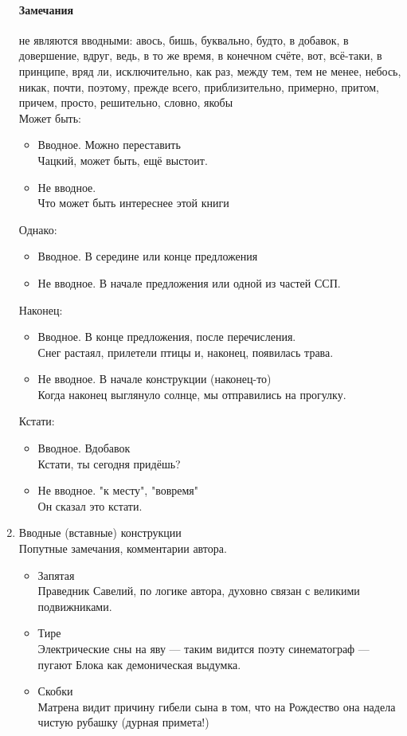 \documentclass{article}
\begin{document}
\begin{enumerate}
  \paragraph{Замечания} не являются вводными:
  авось, бишь, буквально, будто, в добавок, в довершение, вдруг, ведь, в то же время, в конечном счёте, вот, всё-таки,
  в принципе, вряд ли, исключительно, как раз, между тем, тем не менее, небось, никак, почти, поэтому, прежде всего,
  приблизительно, примерно, притом, причем, просто, решительно, словно, якобы\\
  Может быть:
  \begin{itemize}
  \item
    Вводное. Можно переставить\\
    Чацкий, может быть, ещё выстоит.
  \item
    Не вводное.\\
    Что может быть интереснее этой книги
  \end{itemize}
  Однако:
  \begin{itemize}
  \item
    Вводное. В середине или конце предложения
  \item
    Не вводное. В начале предложения или одной из частей ССП.
  \end{itemize}
  Наконец:
  \begin{itemize}
  \item
    Вводное. В конце предложения, после перечисления.\\
    Снег растаял, прилетели птицы и, наконец, появилась трава.
  \item
    Не вводное. В начале конструкции (наконец-то)\\
    Когда наконец выглянуло солнце, мы отправились на прогулку.
  \end{itemize}
  Кстати:
  \begin{itemize}
  \item
    Вводное. Вдобавок\\
    Кстати, ты сегодня придёшь?
  \item
    Не вводное. "к месту", "вовремя"\\
    Он сказал это кстати.
  \end{itemize}
\item
  Вводные (вставные) конструкции\\
  Попутные замечания, комментарии автора.
  \begin{itemize}
  \item
    Запятая\\
    Праведник Савелий, по логике автора, духовно связан с великими подвижниками.
  \item
    Тире\\
    Электрические сны на яву --- таким видится поэту синематограф --- пугают Блока как демоническая выдумка.
  \item
    Скобки\\
    Матрена видит причину гибели сына в том, что на Рождество она надела чистую рубашку (дурная примета!)
  \end{itemize}
  
\end{enumerate}
\end{document}
